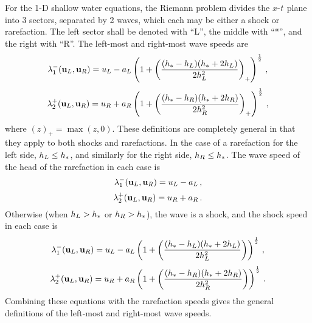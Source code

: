 For the 1-D shallow water equations, the Riemann problem divides the
$x$-$t$ plane into 3 sectors, separated by 2 waves, which
each may be either a shock or rarefaction. The left sector shall be
denoted with ``L'', the middle with ``*'', and the right with ``R''.
The left-most and right-most wave speeds are
\begin{equation}\label{eq:left_wave_speed}
  \lambda_1^-(\mathbf{u}_L, \mathbf{u}_R)
    = u_L - a_L\left(1 + \left(
    \frac{(h_* - h_L)(h_* + 2h_L)}{2h_L^2}\right)_+\right)^{\frac{1}{2}}
    \,,
\end{equation}
\begin{equation}\label{eq:right_wave_speed}
  \lambda_2^+(\mathbf{u}_L, \mathbf{u}_R)
    = u_R + a_R\left(1 + \left(
    \frac{(h_* - h_R)(h_* + 2h_R)}{2h_R^2}\right)_+\right)^{\frac{1}{2}}
    \,,
\end{equation}
where $(z)_+=\max(z,0)$. These definitions are completely general in that
they apply to both shocks and rarefactions. In the case of a rarefaction
for the left side, $h_L \leq h_*$, and similarly for the right
side, $h_R \leq h_*$. The wave speed of the head of the rarefaction
in each case is
\begin{equation}\label{eq:leftwavespeed_rarefaction}
  \lambda_1^-(\mathbf{u}_L, \mathbf{u}_R)
    = u_L - a_L
    \,,
\end{equation}
\begin{equation}\label{eq:rightwavespeed_rarefaction}
  \lambda_2^+(\mathbf{u}_L, \mathbf{u}_R)
    = u_R + a_R
    \,.
\end{equation}
Otherwise (when $h_L > h_*$ or $h_R > h_*$), the
wave is a shock, and the shock speed in each case is
\begin{equation}\label{eq:left_shockspeed}
  \lambda_1^-(\mathbf{u}_L, \mathbf{u}_R)
    = u_L - a_L\left(1 + \left(
    \frac{(h_* - h_L)(h_* + 2h_L)}{2h_L^2}\right)\right)^{\frac{1}{2}}
    \,,
\end{equation}
\begin{equation}
  \lambda_2^+(\mathbf{u}_L, \mathbf{u}_R)
    = u_R + a_R\left(1 + \left(
    \frac{(h_* - h_R)(h_* + 2h_R)}{2h_R^2}\right)\right)^{\frac{1}{2}}
    \,.
\end{equation}
Combining these equations with the rarefaction speeds gives the general
definitions of the left-most and right-most wave speeds.

